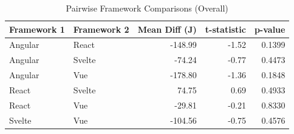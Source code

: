 \begin{table}[htbp]
\centering
\caption{Pairwise Framework Comparisons (Overall)}
\label{tab:pairwise}
\begin{tabular}{llrrr}
\toprule
\textbf{Framework 1} & \textbf{Framework 2} & \textbf{Mean Diff (J)} & \textbf{t-statistic} & \textbf{p-value} \\
\midrule
Angular  & React    & -148.99 &   -1.52 & 0.1399 \\
Angular  & Svelte   &  -74.24 &   -0.77 & 0.4473 \\
Angular  & Vue      & -178.80 &   -1.36 & 0.1848 \\
React    & Svelte   &   74.75 &    0.69 & 0.4933 \\
React    & Vue      &  -29.81 &   -0.21 & 0.8330 \\
Svelte   & Vue      & -104.56 &   -0.75 & 0.4576 \\
\bottomrule
\end{tabular}
\end{table}